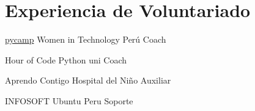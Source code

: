 \section{Experiencia de Voluntariado}

{\href{http://www.witperu.org/proyectos/teens-pycamp/}{pycamp}}
{Women in Technology Perú}
{Coach}{}
{}  

{Hour of Code}
{Python uni}
{Coach}{}
{}  

{Aprendo Contigo}
{Hospital del Niño}
{Auxiliar}{}
{}  

{INFOSOFT}
{Ubuntu Peru}
{Soporte}{}
{}  
